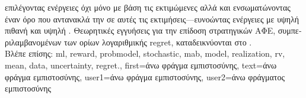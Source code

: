 {{{		επιλέγοντας ενέργειες όχι μόνο με βάση τις εκτιμώμενες}  \foreignlanguage{greek}{αλλά και
		ενσωματώνοντας έναν όρο που αντανακλά την}  \foreignlanguage{greek}{σε αυτές τις 
		εκτιμήσεις—ευνοώντας ενέργειες με υψηλή πιθανή}  \foreignlanguage{greek}{και υψηλή} 
		. \foreignlanguage{greek}{Θεωρητικές εγγυήσεις για την επίδοση στρατηγικών ΑΦΕ, 
		συμπεριλαμβανομένων των ορίων λογαριθμικής} \gls{regret}, \foreignlanguage{greek}{καταδεικνύονται στο} \cite{Bubeck2012}.
		\\
		\foreignlanguage{greek}{Βλέπε επίσης:} \gls{ml}, \gls{reward}, \gls{probmodel}, \gls{stochastic}, \gls{mab}, \gls{model}, 
		\gls{realization}, \gls{rv}, \gls{mean}, \gls{data}, \gls{uncertainty}, \gls{regret}.},
	first={\foreignlanguage{greek}{άνω φράγμα εμπιστοσύνης}},
	text={\foreignlanguage{greek}{άνω φράγμα εμπιστοσύνης}},
	user1={\foreignlanguage{greek}{άνω φράγμα εμπιστοσύνης}}, %
    	user2={\foreignlanguage{greek}{άνω φράγματος εμπιστοσύνης}} %
}

